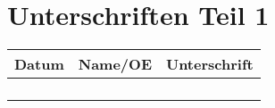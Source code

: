 \chapter{Unterschriften Teil 1}
\begin{comment}
    Lernende und Fachvorgesetzte haben das Arbeitsjournal vor der Abgabe zu unterzeichnen und somit dessen Authentizität zu bezeugen. (Unterschrift auf dem gelben Deckblatt ist zwingend!!!).
    Der Form halber sollten jeweils Teil 1 und Teil 2 in jedem Dokument unterschreiben werden.
\end{comment}

\begin{tabularx}{0.9\textwidth}{| X | X | X |}
    \hline
    \textbf{Datum} & \textbf{Name/OE} & \textbf{Unterschrift} \\
    \hline
                   & & \\
                   & & \\
    \hline
                   & & \\
                   & & \\
    \hline
\end{tabularx}
